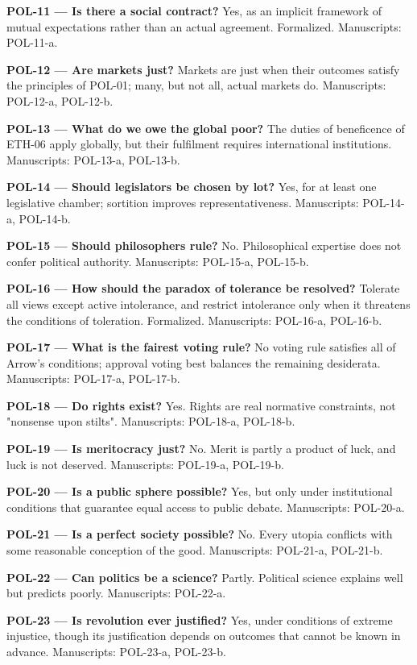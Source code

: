 \documentclass[10pt]{article}
\begin{document}
\textbf{POL-11 --- Is there a social contract?} Yes, as an implicit framework of mutual expectations rather than an actual agreement. Formalized. Manuscripts: POL-11-a.

\textbf{POL-12 --- Are markets just?} Markets are just when their outcomes satisfy the principles of POL-01; many, but not all, actual markets do. Manuscripts: POL-12-a, POL-12-b.

\textbf{POL-13 --- What do we owe the global poor?} The duties of beneficence of ETH-06 apply globally, but their fulfilment requires international institutions. Manuscripts: POL-13-a, POL-13-b.

\textbf{POL-14 --- Should legislators be chosen by lot?} Yes, for at least one legislative chamber; sortition improves representativeness. Manuscripts: POL-14-a, POL-14-b.

\textbf{POL-15 --- Should philosophers rule?} No. Philosophical expertise does not confer political authority. Manuscripts: POL-15-a, POL-15-b.

\textbf{POL-16 --- How should the paradox of tolerance be resolved?} Tolerate all views except active intolerance, and restrict intolerance only when it threatens the conditions of toleration. Formalized. Manuscripts: POL-16-a, POL-16-b.

\textbf{POL-17 --- What is the fairest voting rule?} No voting rule satisfies all of Arrow's conditions; approval voting best balances the remaining desiderata. Manuscripts: POL-17-a, POL-17-b.

\textbf{POL-18 --- Do rights exist?} Yes. Rights are real normative constraints, not "nonsense upon stilts". Manuscripts: POL-18-a, POL-18-b.

\textbf{POL-19 --- Is meritocracy just?} No. Merit is partly a product of luck, and luck is not deserved. Manuscripts: POL-19-a, POL-19-b.

\textbf{POL-20 --- Is a public sphere possible?} Yes, but only under institutional conditions that guarantee equal access to public debate. Manuscripts: POL-20-a.

\textbf{POL-21 --- Is a perfect society possible?} No. Every utopia conflicts with some reasonable conception of the good. Manuscripts: POL-21-a, POL-21-b.

\textbf{POL-22 --- Can politics be a science?} Partly. Political science explains well but predicts poorly. Manuscripts: POL-22-a.

\textbf{POL-23 --- Is revolution ever justified?} Yes, under conditions of extreme injustice, though its justification depends on outcomes that cannot be known in advance. Manuscripts: POL-23-a, POL-23-b.
\end{document}
